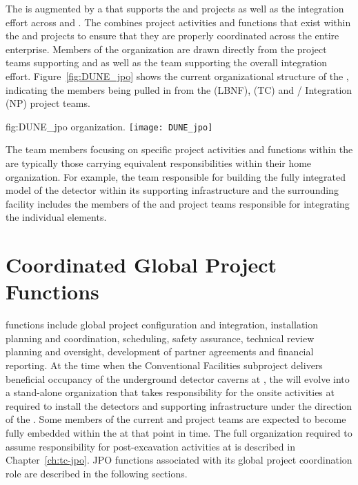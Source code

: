 The  is augmented by a  that supports the
 and  projects as well as the integration
effort across  and . The  combines
project activities and functions that exist within the  and 
projects to ensure that they are properly coordinated across the
entire enterprise.  Members of the  organization are drawn directly
from the project teams supporting  and  as well as the team
supporting the overall integration effort.  Figure~\ref{fig:DUNE_jpo} shows the
current organizational structure of the , indicating the members
being pulled in from the  (LBNF),  (TC) and /
Integration (NP) project teams.
\begin{dunefigure}{fig:DUNE_jpo}
  { organization.}
  \texttt{[image: DUNE\_jpo]}
\end{dunefigure}
The team members focusing on specific project activities and functions
within the  are typically those carrying equivalent
responsibilities within their home organization.  For example, the
 team responsible for building the fully integrated model
of the detector within its supporting infrastructure and the
surrounding facility includes the members of the  and
 project teams responsible for integrating the individual
elements.

\section{Coordinated Global Project Functions}
\label{sec:global_project}

 functions include global project configuration and integration,
installation planning and coordination, scheduling, safety assurance,
technical review planning and oversight, development of partner
agreements and financial reporting.  At the time when the 
Conventional Facilities subproject delivers beneficial occupancy of
the underground detector caverns at , the  will evolve into a
stand-alone organization that takes responsibility for the onsite
activities at  required to install the detectors and supporting
infrastructure under the direction of the .
Some members of the current  and  project teams are
expected to become fully embedded within the  at that point in
time.  The full  organization required to assume responsibility for
post-excavation activities at  is described in Chapter~\ref{ch:tc-jpo}.
JPO functions associated with its global project coordination role
are described in the following sections.

